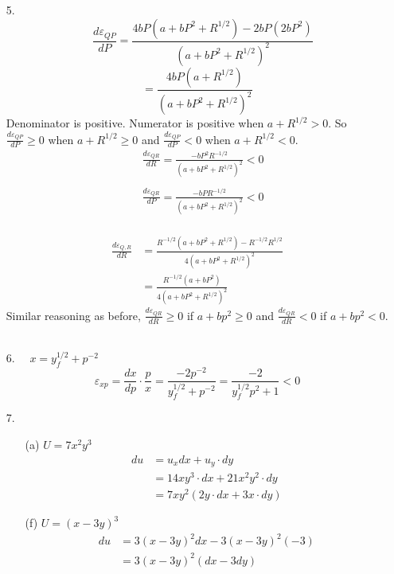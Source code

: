 \documentclass{./../../Latex/homework}
\begin{document}
\begin{enumerate}
\item[5.] $$\quad \frac{d \varepsilon_{Q P}}{d P}=\frac{4 b P\left(a+b P^{2}+R^{1 / 2}\right)-2 b P\left(2 b P^{2}\right)}{\left(a+b P^{2}+R^{1 / 2}\right)^{2}}$$
$$
=\frac{4 b P\left(a+R^{1 / 2}\right)}{\left(a+b P^{2}+R^{1 / 2}\right)^{2}}
$$
Denominator is positive. Numerator is positive when $a+R^{1 / 2}>0$.
So $\frac{d \varepsilon_{Q P}}{d P} \geq 0$ when $ a+R^{1 / 2} \geq 0$ and $\frac{d \varepsilon_{Q P}}{d P} < 0$ when $ a+R^{1 / 2} < 0$. \\
$$
\begin{aligned}
&\frac{d \varepsilon_{Q R}}{d R}=\frac{-b P^{2} R^{-1 / 2}}{\left(a+b P^{2}+R^{1 / 2}\right)^{2}}<0 \\~\\
&\frac{d \varepsilon_{Q R}}{d P}=\frac{-b P R^{-1 / 2}}{\left(a+b P^{2}+R^{1 / 2}\right)^{2}}<0
\end{aligned}
$$ \\
$$
\begin{aligned}
\frac{d \varepsilon_{Q, R}}{d R} &=\frac{R^{-1 / 2}\left(a+b P^{2}+R^{1 / 2}\right)-R^{-1 / 2} R^{1 / 2}}{4\left(a+b P^{2}+R^{1 / 2}\right)^{2}} \\
&=\frac{R^{-1 / 2}\left(a+b P^{2}\right)}{4\left(a+b P^{2}+R^{1 / 2}\right)^{2}}
\end{aligned}
$$
Similar reasoning as before, $\frac{d \varepsilon_{Q R}}{d R} \geq 0$ if $a+b p^{2} \geq 0$ and 
$\frac{d \varepsilon_{Q R}}{d R} < 0$ if $a+b p^{2} < 0$. \\~\\

\item[6.] $\quad x=y_{f}^{1 / 2}+p^{-2}$
$$
\varepsilon_{x p}=\frac{d x}{d p} \cdot \frac{p}{x}=\frac{-2 p^{-2}}{y_{f}^{1 / 2}+p^{-2}}=\frac{-2}{y_{f}^{1 / 2} p^{2}+1}<0
$$

\item[7.] 
\begin{enumerate}

\item[(a)] $U=7 x^{2} y^{3}$
$$
\begin{aligned}
d u &=u_{x} d x+u_{y} \cdot d y \\
&=14 x y^{3} \cdot d x+21 x^{2} y^{2} \cdot d y \\
&=7 x y^{2}(2 y \cdot d x+3 x \cdot d y)
\end{aligned}
$$

\item[(f)] $U =(x-3 y)^{3}$
$$
\begin{aligned}
d u &=3(x-3 y)^{2} d x-3(x-3 y)^{2}(-3) \\
&=3(x-3 y)^{2}(d x-3 d y)
\end{aligned}
$$ \\
\end{enumerate}
\end{enumerate}
\end{document}
